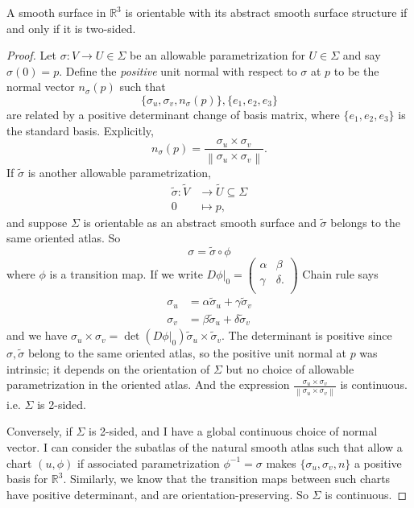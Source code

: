 \leavevmode
\begin{lemma}
    A smooth surface in \(\mathbb{R}^3\) is orientable with its abstract smooth surface structure if and only if it is two-sided.
\end{lemma}
\begin{proof}
    Let \(\sigma: V \to U \in \Sigma\) be an allowable parametrization for \(U\in \Sigma\) and say \(\sigma(0) = p\). Define the \textit{positive} unit normal with respect to \(\sigma\) at \(p\) to be the normal vector \(n_\sigma(p)\) such that
    \[
        \{\sigma_u,\sigma_v,n_\sigma(p)\}, \{e_1, e_2, e_3\}
    \]
    are related by a positive determinant change of basis matrix, where \(\{e_1, e_2, e_3\}\) is the standard basis. Explicitly,
    \[
        n_\sigma(p) = \frac{\sigma_u \times \sigma_v}{\left\lVert \sigma_{u}\times \sigma_{v}\right\rVert }.
    \]
    If \(\tilde{\sigma}\) is another allowable parametrization,
    \[
    \begin{aligned}
      \tilde{\sigma}\colon \tilde{V} & \longrightarrow   \tilde{U}\subseteq \Sigma \\
      0 &\longmapsto p,
    \end{aligned}
    \]
    and suppose \(\Sigma\) is orientable as an abstract smooth surface and \(\tilde{\sigma}\) belongs to the same oriented atlas. So
    \[
        \sigma = \tilde{\sigma} \circ \phi
    \]
    where \(\phi\) is a transition map. If we write \(\left. D\phi\right|_0 = \begin{pmatrix}
        \alpha &  \beta \\
        \gamma &  \delta. \\
    \end{pmatrix}\) Chain rule says
    \begin{align*}
        \sigma_u &=\alpha \tilde{\sigma}_u + \gamma\tilde{\sigma}_v\\
        \sigma_v &=\beta \tilde{\sigma}_u + \delta\tilde{\sigma}_v
    \end{align*}
    and we have \(\sigma_u \times \sigma_v = \det (\left. D\phi\right|_0)\tilde{\sigma}_u \times \tilde{\sigma}_v\). The determinant is positive since \(\sigma, \tilde{\sigma}\) belong to the same oriented atlas, so the positive unit normal at \(p\) was intrinsic; it depends on the orientation of \(\Sigma\) but no choice of allowable parametrization in the oriented atlas. And the expression \(\frac{\sigma_u \times \sigma_v}{\left\lVert \sigma_u \times \sigma_v\right\rVert }\) is continuous. i.e. \(\Sigma\) is 2-sided.

    Conversely, if \(\Sigma\) is 2-sided, and I have a global continuous choice of normal vector. I can consider the subatlas of the natural smooth atlas such that allow a chart \((u, \phi)\) if associated parametrization \(\phi^{-1}=\sigma\) makes \(\{\sigma_u, \sigma_v, n\}\) a positive basis for \(\mathbb{R}^3\). Similarly, we know that the transition maps between such charts have positive determinant, and are orientation-preserving. So \(\Sigma\) is continuous.
\end{proof}
